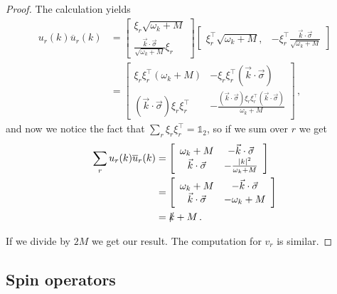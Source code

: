 \documentclass[main.tex]{subfiles}
\begin{document}
\begin{proof}
The calculation yields 
%
\begin{subequations}
\begin{align}
u_r(k) \overline{u}_{r}(k) &=
\left[\begin{array}{c}
\xi_{r}\sqrt{\omega_{k} + M} \\ 
\displaystyle
\frac{\vec{k} \cdot \vec{\sigma}}{\sqrt{\omega_{k} + M}} 
\xi_{r}
\end{array}\right]
\left[\begin{array}{cc}
\xi_{r}^{\top} \sqrt{\omega_{k} + M}, & 
\displaystyle
- \xi_{r}^{\top} \frac{\vec{k} \cdot \vec{\sigma}}{\sqrt{\omega_{k} + M}}
\end{array}\right]  \\
&= \left[\begin{array}{cc}
\xi_{r} \xi_{r}^{\top} (\omega_{k} + M) & - \xi_{r} \xi_{r}^{\top} (\vec{k} \cdot \vec{\sigma}) \\ 
(\vec{k} \cdot \vec{\sigma}) \xi_{r} \xi_{r}^{\top} & 
- \frac{ (\vec{k}\cdot \vec{\sigma}) \xi_{r} \xi_{r}^{\top} (\vec{k} \cdot \vec{\sigma})}{\omega_{k} + M}
\end{array}\right]
\,,
\end{align}
\end{subequations}
%
and now we notice the fact that \(\sum _{r} \xi_{r} \xi_{r} ^{\top} = \mathbb{1}_{2}\), so if we sum over \(r\) we get 
%
\begin{subequations}
\begin{align}
\sum _{r} u_r (k) \overline{u}_{r}(k) &=
\left[\begin{array}{cc}
\omega_{k} + M & - \vec{k} \cdot \vec{\sigma} \\ 
\vec{k} \cdot \vec{\sigma} & - \frac{\abs{k}^2}{\omega_{k} + M}
\end{array}\right]  \\
&= \left[\begin{array}{cc}
\omega_{k} + M & - \vec{k} \cdot \vec{\sigma} \\ 
\vec{k} \cdot \vec{\sigma} & - \omega_{k} + M
\end{array}\right]  \\
&= \slashed{k} + M
\,.
\end{align}
\end{subequations}

If we divide by \(2M\) we get our result. 
The computation for \(v_{r}\) is similar. 
\end{proof}

\subsection{Spin operators}
\end{document}
